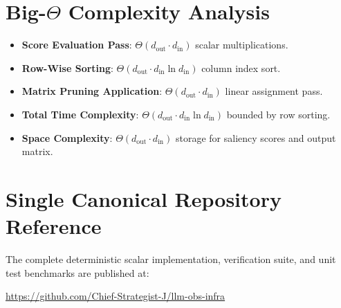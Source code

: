 \documentclass[11pt,a4paper]{article}
\theoremstyle{definition}
\begin{document}
\section{Big-$\Theta$ Complexity Analysis}

\begin{itemize}
    \item \textbf{Score Evaluation Pass}: $\Theta(d_{\text{out}} \cdot d_{\text{in}})$ scalar multiplications.
    \item \textbf{Row-Wise Sorting}: $\Theta(d_{\text{out}} \cdot d_{\text{in}} \ln d_{\text{in}})$ column index sort.
    \item \textbf{Matrix Pruning Application}: $\Theta(d_{\text{out}} \cdot d_{\text{in}})$ linear assignment pass.
    \item \textbf{Total Time Complexity}: $\Theta(d_{\text{out}} \cdot d_{\text{in}} \ln d_{\text{in}})$ bounded by row sorting.
    \item \textbf{Space Complexity}: $\Theta(d_{\text{out}} \cdot d_{\text{in}})$ storage for saliency scores and output matrix.
\end{itemize}

\section{Single Canonical Repository Reference}

The complete deterministic scalar implementation, verification suite, and unit test benchmarks are published at:
\begin{center}
\url{https://github.com/Chief-Strategist-J/llm-obs-infra}
\end{center}
\end{document}

